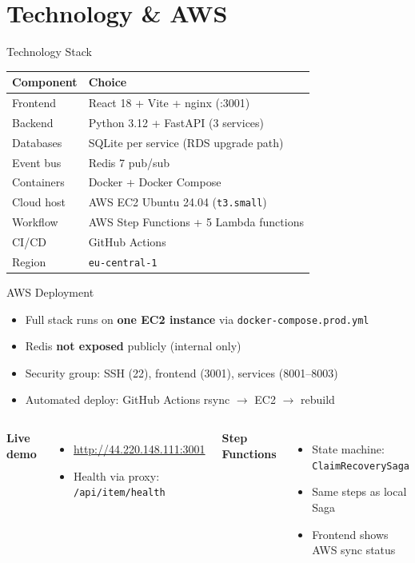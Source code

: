 \documentclass[11pt,aspectratio=169]{beamer}
\begin{document}
\section{Technology \& AWS}

\begin{frame}{Technology Stack}
  \small
  \begin{tabular}{@{}ll@{}}
    \toprule
    \textbf{Component} & \textbf{Choice} \\
    \midrule
    Frontend      & React 18 + Vite + nginx (:3001) \\
    Backend       & Python 3.12 + FastAPI (3 services) \\
    Databases     & SQLite per service (RDS upgrade path) \\
    Event bus     & Redis 7 pub/sub \\
    Containers    & Docker + Docker Compose \\
    Cloud host    & AWS EC2 Ubuntu 24.04 (\texttt{t3.small}) \\
    Workflow      & AWS Step Functions + 5 Lambda functions \\
    CI/CD         & GitHub Actions \\
    Region        & \texttt{eu-central-1} \\
    \bottomrule
  \end{tabular}
\end{frame}

\begin{frame}{AWS Deployment}
  \begin{itemize}
    \item Full stack runs on \textbf{one EC2 instance} via \texttt{docker-compose.prod.yml}
    \item Redis \textbf{not exposed} publicly (internal only)
    \item Security group: SSH (22), frontend (3001), services (8001--8003)
    \item Automated deploy: GitHub Actions rsync $\rightarrow$ EC2 $\rightarrow$ rebuild
  \end{itemize}
  \vspace{0.4cm}
  \begin{columns}[T]
    \textbf{Live demo}
    \begin{itemize}
      \item \url{http://44.220.148.111:3001}
      \item Health via proxy:
      \texttt{/api/item/health}
    \end{itemize}
    \textbf{Step Functions}
    \begin{itemize}
      \item State machine: \texttt{ClaimRecoverySaga}
      \item Same steps as local Saga
      \item Frontend shows AWS sync status
    \end{itemize}
  \end{columns}
\end{frame}
\end{document}
